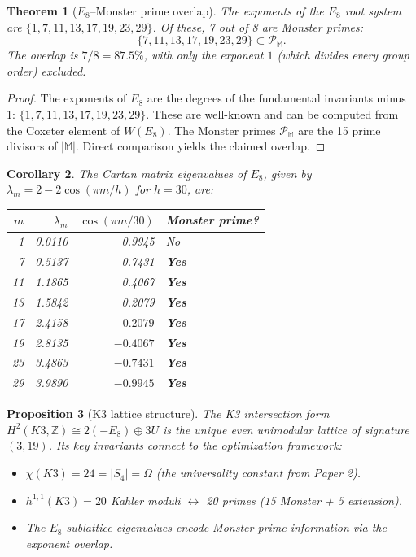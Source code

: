\documentclass[11pt]{amsart}
\newtheorem{theorem}{Theorem}[section]
\newtheorem{proposition}[theorem]{Proposition}
\newtheorem{corollary}[theorem]{Corollary}
\theoremstyle{definition}
\begin{document}
\begin{theorem}[$E_8$--Monster prime overlap]\label{thm:e8}
The exponents of the $E_8$ root system are $\{1, 7, 11, 13, 17, 19, 23, 29\}$. Of these, 7 out of 8 are Monster primes:
\[
\{7, 11, 13, 17, 19, 23, 29\} \subset \mathcal{P}_{\mathbb{M}}.
\]
The overlap is $7/8 = 87.5\%$, with only the exponent $1$ (which divides every group order) excluded.
\end{theorem}

\begin{proof}
The exponents of $E_8$ are the degrees of the fundamental invariants minus 1: $\{1, 7, 11, 13, 17, 19, 23, 29\}$. These are well-known and can be computed from the Coxeter element of $W(E_8)$. The Monster primes $\mathcal{P}_{\mathbb{M}}$ are the 15 prime divisors of $|\mathbb{M}|$. Direct comparison yields the claimed overlap.
\end{proof}

\begin{corollary}
The Cartan matrix eigenvalues of $E_8$, given by $\lambda_m = 2 - 2\cos(\pi m / h)$ for $h = 30$, are:
\begin{center}
\begin{tabular}{r r r l}
\toprule
$m$ & $\lambda_m$ & $\cos(\pi m/30)$ & Monster prime? \\
\midrule
1 & 0.0110 & 0.9945 & No \\
7 & 0.5137 & 0.7431 & \textbf{Yes} \\
11 & 1.1865 & 0.4067 & \textbf{Yes} \\
13 & 1.5842 & 0.2079 & \textbf{Yes} \\
17 & 2.4158 & $-0.2079$ & \textbf{Yes} \\
19 & 2.8135 & $-0.4067$ & \textbf{Yes} \\
23 & 3.4863 & $-0.7431$ & \textbf{Yes} \\
29 & 3.9890 & $-0.9945$ & \textbf{Yes} \\
\bottomrule
\end{tabular}
\end{center}
\end{corollary}

\begin{proposition}[K3 lattice structure]
The K3 intersection form $H^2(K3, \mathbb{Z}) \cong 2(-E_8) \oplus 3U$ is the unique even unimodular lattice of signature $(3, 19)$. Its key invariants connect to the optimization framework:
\begin{itemize}
\item $\chi(K3) = 24 = |S_4| = \Omega$ (the universality constant from Paper 2).
\item $h^{1,1}(K3) = 20$ Kahler moduli $\leftrightarrow$ 20 primes (15 Monster + 5 extension).
\item The $E_8$ sublattice eigenvalues encode Monster prime information via the exponent overlap.
\end{itemize}
\end{proposition}
\end{document}
